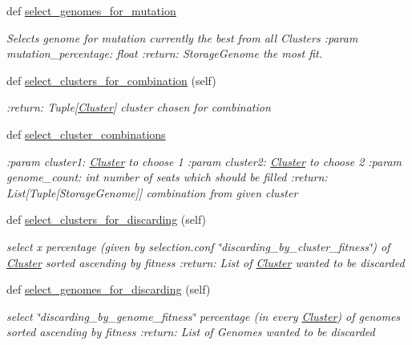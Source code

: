 \begin{DoxyCompactItemize}
def \hyperlink{classNEAT__PyGenetics_1_1NEAT_1_1Analyst_1_1GenomeSelector_1_1GenomeSelector_af335a5342b0a1695c52d61274c83b0bf}{select\+\_\+genomes\+\_\+for\+\_\+mutation}
\begin{DoxyCompactList}\small\item\em Selects genome for mutation currently the best from all Clusters \+:param mutation\+\_\+percentage\+: float \+:return\+: Storage\+Genome the most fit. \end{DoxyCompactList}\item 
def \hyperlink{classNEAT__PyGenetics_1_1NEAT_1_1Analyst_1_1GenomeSelector_1_1GenomeSelector_a9e1d64bae210147a47049f1c8c389bfc}{select\+\_\+clusters\+\_\+for\+\_\+combination} (self)
\begin{DoxyCompactList}\small\item\em \+:return\+: Tuple\mbox{[}\hyperlink{namespaceNEAT__PyGenetics_1_1NEAT_1_1Analyst_1_1Cluster}{Cluster}\mbox{]} cluster chosen for combination \end{DoxyCompactList}\item 
def \hyperlink{classNEAT__PyGenetics_1_1NEAT_1_1Analyst_1_1GenomeSelector_1_1GenomeSelector_a08b5d1264a5dadc1ec98affabf1ab76d}{select\+\_\+cluster\+\_\+combinations}
\begin{DoxyCompactList}\small\item\em \+:param cluster1\+: \hyperlink{namespaceNEAT__PyGenetics_1_1NEAT_1_1Analyst_1_1Cluster}{Cluster} to choose 1 \+:param cluster2\+: \hyperlink{namespaceNEAT__PyGenetics_1_1NEAT_1_1Analyst_1_1Cluster}{Cluster} to choose 2 \+:param genome\+\_\+count\+: int number of seats which should be filled \+:return\+: List\mbox{[}Tuple\mbox{[}Storage\+Genome\mbox{]}\mbox{]} combination from given cluster \end{DoxyCompactList}\item 
def \hyperlink{classNEAT__PyGenetics_1_1NEAT_1_1Analyst_1_1GenomeSelector_1_1GenomeSelector_a1016a10b5301bd2a1fd770dceda6644b}{select\+\_\+clusters\+\_\+for\+\_\+discarding} (self)
\begin{DoxyCompactList}\small\item\em select x percentage (given by selection.\+conf \char`\"{}discarding\+\_\+by\+\_\+cluster\+\_\+fitness\char`\"{}) of \hyperlink{namespaceNEAT__PyGenetics_1_1NEAT_1_1Analyst_1_1Cluster}{Cluster} sorted ascending by fitness \+:return\+: List of \hyperlink{namespaceNEAT__PyGenetics_1_1NEAT_1_1Analyst_1_1Cluster}{Cluster} wanted to be discarded \end{DoxyCompactList}\item 
def \hyperlink{classNEAT__PyGenetics_1_1NEAT_1_1Analyst_1_1GenomeSelector_1_1GenomeSelector_af7cd898b9a5bbc1e2e407256a385f865}{select\+\_\+genomes\+\_\+for\+\_\+discarding} (self)
\begin{DoxyCompactList}\small\item\em select \char`\"{}discarding\+\_\+by\+\_\+genome\+\_\+fitness\char`\"{} percentage (in every \hyperlink{namespaceNEAT__PyGenetics_1_1NEAT_1_1Analyst_1_1Cluster}{Cluster}) of genomes sorted ascending by fitness \+:return\+: List of Genomes wanted to be discarded \end{DoxyCompactList}\end{DoxyCompactItemize}
